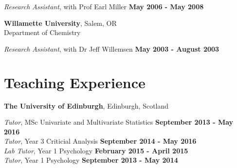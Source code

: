 \documentclass[margin,line]{res}
\begin{document}
\begin{resume}
\vspace{-.2cm}
{\em Research Assistant}, with Prof Earl Miller \hfill {\bf May 2006 - May 2008}\\
\vspace{-.3cm}


\vspace{-.1cm}

{\bf Willamette University}, Salem, OR \\
Department of Chemistry

\vspace{-.2cm}
{\em Research Assistant}, with Dr Jeff Willemsen \hfill {\bf May 2003 - August 2003}\\

\vspace{-.1cm}


\section{\sc Teaching Experience}

{\bf  The University of Edinburgh}, Edinburgh, Scotland

\vspace{-.3cm}

\vspace{.1cm}
{\em Tutor}, MSc Univariate and Multivariate Statistics \hfill {\bf September 2013 - May 2016}\\

\vspace{-.4cm}
{\em Tutor}, Year 3 Criticial Analysis \hfill {\bf September 2014 - May 2016}\\

\vspace{-.4cm}
{\em Lab Tutor}, Year 1 Psychology \hfill {\bf February 2015 - April 2015}\\

\vspace{-.4cm}
{\em Tutor}, Year 1 Psychology \hfill {\bf September 2013 - May 2014}\\
\vspace{-.3cm}

\vspace{0.5cm}


\end{resume}
\end{document}
